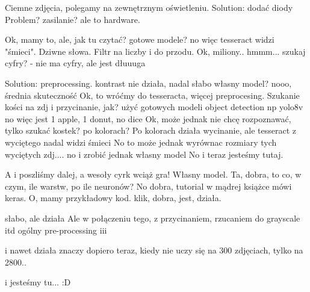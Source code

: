 Ciemne zdjęcia, polegamy na zewnętrznym oświetleniu.
Solution: dodać diody
Problem? zasilanie? ale to hardware.

Ok, mamy to, ale, jak tu czytać? gotowe modele?
no więc tesseract widzi "śmieci". Dziwne słowa.
Filtr na liczby i do przodu.
Ok, miliony.. hmmm...
szukaj cyfry? - nie ma cyfry, ale jest dłuuuga

Solution: preprocessing.
kontrast
nie działa, nadal słabo
własny model?
nooo, średnia skuteczność
Ok, to wróćmy do tesseracta, więcej preprocesing.
Szukanie kości na zdj i przycinanie, jak?
użyć gotowych modeli object detection np yolo8v
no więc jest 1 apple, 1 donut, no dice
Ok, może jednak nie chcę rozpoznawać, tylko szukać kostek?
po kolorach?
Po kolorach działa wycinanie, ale tesseract z wyciętego nadal widzi śmieci
No to może jednak wyrównac rozmiary tych wyciętych zdj.... no i zrobić jednak własny model
No i teraz jesteśmy tutaj.

A i poszliśmy dalej, a wesoły cyrk wciąż gra!
Własny model. Ta, dobra, to co, w czym, ile warstw, po ile neuronów?
No dobra, tutorial w mądrej książce mówi keras.
O, mamy przykładowy kod.
klik, dobra, jest, działa.

słabo, ale działa
Ale w połączeniu tego, z przycinaniem, rzucaniem do grayscale itd ogólny pre-processing iii

i nawet działa
znaczy dopiero teraz, kiedy nie uczy się na 300 zdjęciach, tylko na 2800..

i jesteśmy tu... :D



